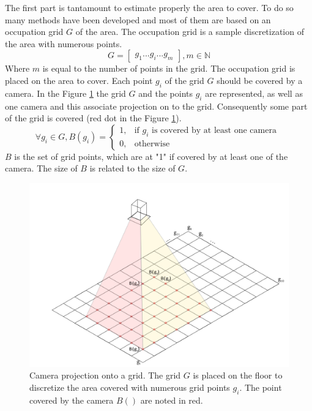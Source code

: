 
The first part is tantamount to estimate properly the area to cover. To do so many methods have been developed and most of them are based on an occupation grid $G$ of the area. The occupation grid is a sample discretization of the area with numerous points.
\begin{equation}\label{eq:Grid}
	G=\begin{bmatrix}
	 	g_1 ...g_i ... g_m
	\end{bmatrix}  , m\in \mathbb{N}
\end{equation}
Where $m$ is equal to the number of points in the grid.
The occupation grid is placed on the area to cover. Each point $g_i$ of the grid $G$ should be covered by a camera. In the Figure \ref{fig:cam_projOnGrid} the grid $G$ and the points $g_i$ are represented, as well as one camera and this associate projection on to the grid.
 Consequently some part of the grid is covered (red dot in the Figure \ref{fig:cam_projOnGrid}). 
\begin{equation}\label{eq:B}
\forall g_i \in G, B(g_i)= \begin{cases} 1, & \mbox{if } g_i \mbox{ is covered by at least one camera }\\ 0, & \mbox{otherwise}   \end{cases}
\end{equation}
$B$ is the set of grid points, which are at "1"  if covered by at least one of the camera. The size of $B$ is related to the size of $G$.
\begin{figure}[t!]
		\centering
  		\includegraphics[width=\linewidth]{img/CamProjectOnGrid2.png}
  
 	 	\endminipage\hfill\caption{Camera projection onto a grid. The grid $G$ is placed on the floor to discretize the area covered with numerous grid points $g_i$. The point covered by the camera $B()$ are noted in red.}\label{fig:cam_projOnGrid}
\end{figure}
